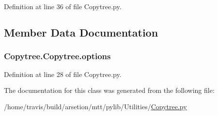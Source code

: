 Definition at line 36 of file Copytree.\-py.



\subsection{Member Data Documentation}
\hypertarget{classCopytree_1_1Copytree_ab12d2712ffd4aba7ddd4c5ceadec153b}{
\subsubsection[{options}]{\setlength{\rightskip}{0pt plus 5cm}Copytree.\-Copytree.\-options}}\label{classCopytree_1_1Copytree_ab12d2712ffd4aba7ddd4c5ceadec153b}


Definition at line 28 of file Copytree.\-py.



The documentation for this class was generated from the following file\-:\begin{DoxyCompactItemize}
\item 
/home/travis/build/arsetion/mtt/pylib/\-Utilities/\hyperlink{Copytree_8py}{Copytree.\-py}\end{DoxyCompactItemize}
